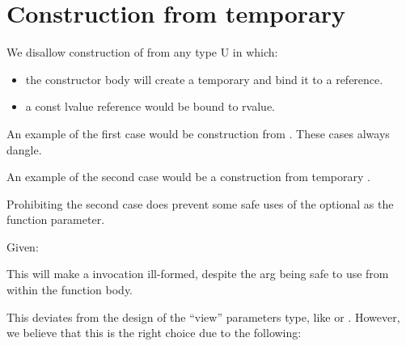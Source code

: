\documentclass[a4paper,10pt,oneside,openany,final,article]{memoir}
\begin{document}
\section{Construction from temporary}

We disallow construction of  from any type U in which:
\begin{itemize}
\item the constructor body will create a temporary and bind it to a reference.
\item a const lvalue reference would be bound to rvalue.
\end{itemize}

An example of the first case would be construction  from . These cases always dangle.

An example of the second case would be a construction  from temporary .

Prohibiting the second case does prevent some safe uses of the optional as the function parameter.

Given:


This will make a  invocation ill-formed, despite the arg being safe to use from within the function body.

This deviates from the design of the ``view'' parameters type, like  or . However, we believe that this is the right choice due to the following:
\end{document}
